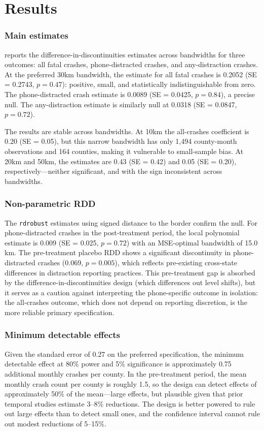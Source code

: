 \documentclass[12pt]{article}
\begin{document}
\section{Results}

\subsubsection*{Main estimates}  reports the difference-in-discontinuities estimates across bandwidths for three outcomes: all fatal crashes, phone-distracted crashes, and any-distraction crashes. At the preferred 30km bandwidth, the estimate for all fatal crashes is 0.2052 (SE = 0.2743, $p = 0.47$): positive, small, and statistically indistinguishable from zero. The phone-distracted crash estimate is 0.0089 (SE = 0.0425, $p = 0.84$), a precise null. The any-distraction estimate is similarly null at 0.0318 (SE = 0.0847, $p = 0.72$).

The results are stable across bandwidths. At 10km the all-crashes coefficient is 0.20 (SE = 0.05), but this narrow bandwidth has only 1,494 county-month observations and 164 counties, making it vulnerable to small-sample bias. At 20km and 50km, the estimates are 0.43 (SE = 0.42) and 0.05 (SE = 0.20), respectively---neither significant, and with the sign inconsistent across bandwidths.



\subsubsection*{Non-parametric RDD} The \texttt{rdrobust} estimates using signed distance to the border confirm the null. For phone-distracted crashes in the post-treatment period, the local polynomial estimate is 0.009 (SE = 0.025, $p = 0.72$) with an MSE-optimal bandwidth of 15.0 km. The pre-treatment placebo RDD shows a significant discontinuity in phone-distracted crashes (0.069, $p = 0.005$), which reflects pre-existing cross-state differences in distraction reporting practices. This pre-treatment gap is absorbed by the difference-in-discontinuities design (which differences out level shifts), but it serves as a caution against interpreting the phone-specific outcome in isolation: the all-crashes outcome, which does not depend on reporting discretion, is the more reliable primary specification.

\subsubsection*{Minimum detectable effects} Given the standard error of 0.27 on the preferred specification, the minimum detectable effect at 80\% power and 5\% significance is approximately 0.75 additional monthly crashes per county. In the pre-treatment period, the mean monthly crash count per county is roughly 1.5, so the design can detect effects of approximately 50\% of the mean---large effects, but plausible given that prior temporal studies estimate 3--8\% reductions. The design is better powered to rule out large effects than to detect small ones, and the confidence interval cannot rule out modest reductions of 5--15\%.
\end{document}
